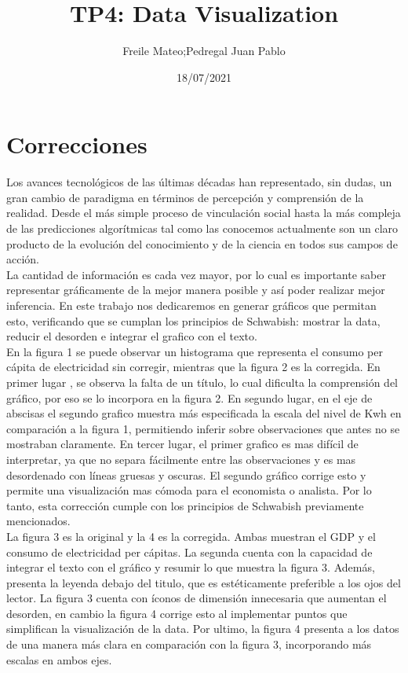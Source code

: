 \documentclass{article}
\title{TP4: Data Visualization}
\author{Freile Mateo;Pedregal Juan Pablo }
\date{18/07/2021}
\begin{document}
\maketitle

\section{Correcciones}

 Los avances tecnológicos de las últimas décadas han representado, sin dudas, un  gran cambio de paradigma en términos de percepción y comprensión de la realidad. Desde el más simple proceso de vinculación social hasta la más compleja de las predicciones algorítmicas tal como las conocemos actualmente son  un claro producto de la evolución del conocimiento y de la ciencia en todos sus campos de acción.\\

La cantidad de información es cada vez mayor, por lo cual es importante saber representar gráficamente de la mejor manera posible y así poder realizar mejor inferencia.
En este trabajo nos dedicaremos en generar gráficos que permitan esto, verificando que se cumplan los principios de Schwabish: mostrar la data, reducir el desorden e integrar el grafico con el texto.\\

En la figura 1 se puede observar un histograma que representa el consumo per cápita de electricidad sin corregir, mientras que la figura 2 es la corregida. En primer lugar , se observa la falta de un título, lo cual dificulta la comprensión del gráfico, por eso se lo incorpora en la figura 2. En segundo lugar, en el eje de abscisas el segundo grafico muestra más especificada la escala del nivel de Kwh en comparación a la figura 1, permitiendo inferir sobre observaciones que antes no se mostraban claramente. En tercer lugar, el primer grafico es mas difícil de interpretar, ya que no separa fácilmente entre las observaciones y es mas desordenado con líneas gruesas y oscuras. El segundo gráfico corrige esto y permite una visualización mas cómoda para el economista o analista.  Por lo tanto, esta corrección cumple con los principios de Schwabish previamente mencionados.\\


La figura 3 es la original y la 4 es la corregida. Ambas muestran el GDP y el consumo de electricidad per cápitas. La segunda cuenta con la capacidad de integrar el texto con el gráfico y resumir lo que muestra la figura 3. Además, presenta la leyenda debajo del titulo, que es estéticamente preferible a los ojos del lector. La figura 3 cuenta con íconos de dimensión innecesaria que aumentan el desorden, en cambio la figura 4 corrige esto al implementar puntos que simplifican la visualización de la data. Por ultimo, la figura 4 presenta a los datos de una manera más clara en comparación con la figura 3, incorporando más escalas en ambos ejes.\\
\end{document}
